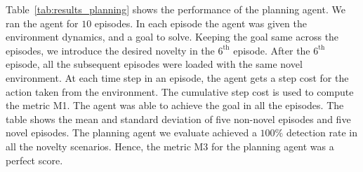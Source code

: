 \documentclass[sigconf]{aamas}
\begin{document}
Table~\ref{tab:results_planning} shows the performance of the planning agent. 
We ran the agent for $10$ episodes. In each episode the agent was given the environment dynamics, and a goal to solve. Keeping the goal same across the episodes, we introduce the desired novelty in the $6^{\text{th}}$ episode. After the $6^{\text{th}}$ episode, all the subsequent episodes were loaded with the same novel environment. At each time step in an episode, the agent gets a step cost for the action taken from the environment. The cumulative step cost is used to compute the metric M1. The agent was able to achieve the goal in all the episodes. The table shows the mean and standard deviation of five non-novel episodes and five novel episodes.
The planning agent we evaluate achieved a $100 \%$ detection rate in all the novelty scenarios. Hence, the metric M3 for the planning agent was a perfect score.
%
\end{document}
